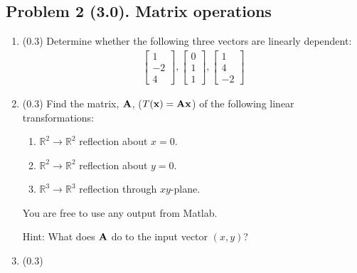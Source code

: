 \documentclass[11pt,titlepage,fleqn]{article}
\begin{document}



\subsection*{Problem 2 (3.0). Matrix operations}

\begin{enumerate}

\item (0.3) Determine whether the following three vectors are linearly dependent:
%
\begin{eqnarray*}
\left[ \begin{array}{r} 1 \\ -2 \\ 4  \end{array} \right],
\left[ \begin{array}{r} 0 \\ 1 \\ 1 \end{array} \right],
\left[ \begin{array}{r} 1 \\ 4 \\ -2 \end{array} \right]
\end{eqnarray*}


\item (0.3) Find the matrix, $\mbox{${\bf A}$}$, ($T(\mbox{${\bf x}$}) = \mbox{${\bf A}$}\mbox{${\bf x}$}$) of the following linear transformations:
%
\begin{enumerate}
\item $\mathbb{R}^2 \rightarrow \mathbb{R}^2$ reflection about $x = 0$.
\item $\mathbb{R}^2 \rightarrow \mathbb{R}^2$ reflection about $y = 0$.
\item $\mathbb{R}^3 \rightarrow \mathbb{R}^3$ reflection through $xy$-plane.
\end{enumerate}
%
You are free to use any output from Matlab.

Hint: What does $\mbox{${\bf A}$}$ do to the input vector $(x,y)$?


\item (0.3)


\end{enumerate}
\end{document}
